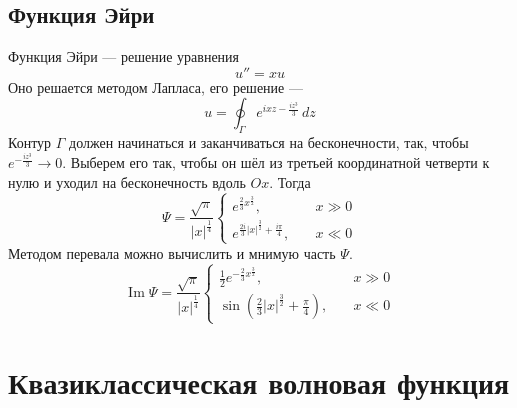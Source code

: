 \documentclass{article}
\begin{document}
\subsection{Функция Эйри}
Функция Эйри --- решение уравнения
\begin{equation}
	u'' = xu
\end{equation}
Оно решается методом Лапласа, его решение ---
\begin{equation}
	u = \oint_\Gamma e^{ixz - \frac{iz^3}{3}}\,dz
\end{equation}
Контур $\Gamma$ должен начинаться и заканчиваться на бесконечности, так, чтобы 
$e^{-\frac{iz^3}{3}} \to 0$. Выберем его так, чтобы он шёл из третьей координатной четверти
к нулю и уходил на бесконечность вдоль $Ox$. Тогда 
\begin{equation}
	\Psi = \frac{\sqrt{\pi}}{|x|^{\frac14}}\left\{ \begin{matrix}
			e^{\frac23 x^{\frac32}}, & \quad x \gg 0 \\
			e^{\frac{2i}{3} |x|^{\frac32} + \frac{i\pi}{4}}, & \quad x \ll 0
			\end{matrix} \right.
\end{equation}
Методом перевала можно вычислить и мнимую часть $\Psi$. 
\begin{equation}
	\operatorname{Im}\Psi = \frac{\sqrt{\pi}}{|x|^{\frac14}}\left\{ \begin{matrix}
			\frac12 e^{-\frac23 x^{\frac32}}, & \quad x \gg 0 \\
			\sin{\left(\frac{2}{3} |x|^{\frac32} + \frac{\pi}{4}\right)}, & \quad x \ll 0
			\end{matrix} \right.
\end{equation}
\section{Квазиклассическая волновая функция}
\end{document}
